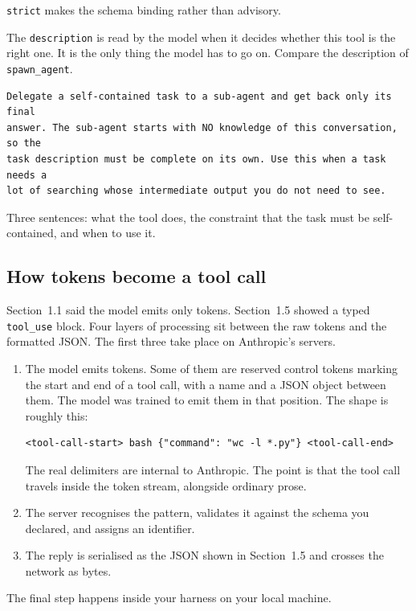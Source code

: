 \documentclass[11pt]{article}
\newcommand{\code}[1]{\texttt{#1}}
\begin{document}
\code{strict} makes the schema binding rather than advisory.

The \code{description} is read by the model when it decides whether this tool is
the right one. It is the only thing the model has to go on. Compare the
description of \code{spawn\_agent}.

\begin{lstlisting}
Delegate a self-contained task to a sub-agent and get back only its final
answer. The sub-agent starts with NO knowledge of this conversation, so the
task description must be complete on its own. Use this when a task needs a
lot of searching whose intermediate output you do not need to see.
\end{lstlisting}

Three sentences: what the tool does, the constraint that the task must be
self-contained, and when to use it.

\clearpage
\subsection{How tokens become a tool call}

Section~1.1 said the model emits only tokens. Section~1.5 showed a typed
\code{tool\_use} block. Four layers of processing sit between the raw tokens and
the formatted JSON. The first three take place on Anthropic's servers.

\begin{enumerate}
\item The model emits tokens. Some of them are reserved control tokens marking
      the start and end of a tool call, with a name and a JSON object between
      them. The model was trained to emit them in that position. The shape is
      roughly this:
\begin{lstlisting}
<tool-call-start> bash {"command": "wc -l *.py"} <tool-call-end>
\end{lstlisting}
      The real delimiters are internal to Anthropic. The point is that the tool
      call travels inside the token stream, alongside ordinary prose.
\item The server recognises the pattern, validates it against the schema you
      declared, and assigns an identifier.
\item The reply is serialised as the JSON shown in Section~1.5 and crosses the
      network as bytes.
\end{enumerate}

The final step happens inside your harness on your local machine.
\end{document}

